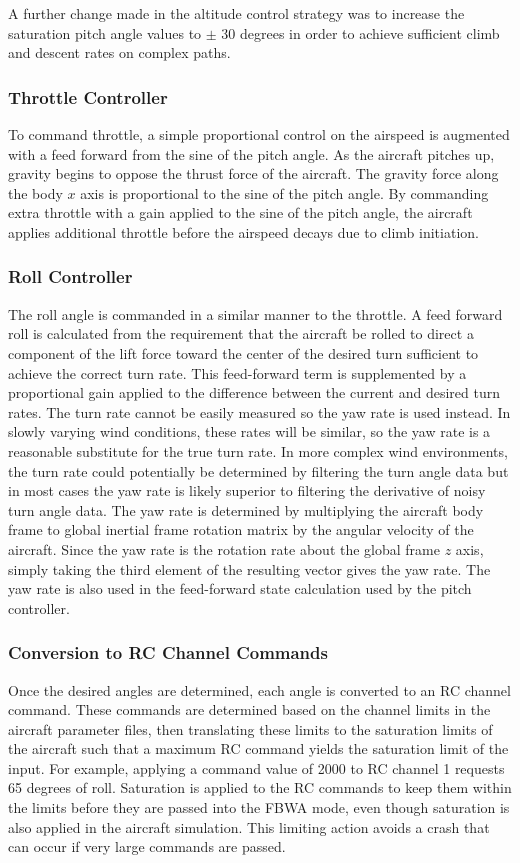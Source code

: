 \documentclass{aiaa}
\begin{document}
A further change made in the altitude control strategy was to increase the saturation pitch angle values to $\pm$ 30 degrees in order to achieve sufficient climb and descent rates on complex paths.

\subsubsection{Throttle Controller}
To command throttle, a simple proportional control on the airspeed is augmented with a feed forward from the sine of the pitch angle. As the aircraft pitches up, gravity begins to oppose the thrust force of the aircraft. The gravity force along the body $x$ axis is proportional to the sine of the pitch angle. By commanding extra throttle with a gain applied to the sine of the pitch angle, the aircraft applies additional throttle before the airspeed decays due to climb initiation.

\subsubsection{Roll Controller}
The roll angle is commanded in a similar manner to the throttle. A feed forward roll is calculated from the requirement that the aircraft be rolled to direct a component of the lift force toward the center of the desired turn sufficient to achieve the correct turn rate. This feed-forward term is supplemented by a proportional gain applied to the difference between the current and desired turn rates. The turn rate cannot be easily measured so the yaw rate is used instead. In slowly varying wind conditions, these rates will be similar, so the yaw rate is a reasonable substitute for the true turn rate. In more complex wind environments, the turn rate could potentially be determined by filtering the turn angle data but in most cases the yaw rate is likely superior to filtering the derivative of noisy turn angle data. The yaw rate is determined by multiplying the aircraft body frame to global inertial frame rotation matrix by the angular velocity of the aircraft. Since the yaw rate is the rotation rate about the global frame $z$ axis, simply taking the third element of the resulting vector gives the yaw rate. The yaw rate is also used in the feed-forward state calculation used by the pitch controller.

\subsubsection{Conversion to RC Channel Commands}
Once the desired angles are determined, each angle is converted to an RC channel command. These commands are determined based on the channel limits in the aircraft parameter files, then translating these limits to the saturation limits of the aircraft such that a maximum RC command yields the saturation limit of the input. For example, applying a command value of 2000 to RC channel 1 requests 65 degrees of roll.  Saturation is applied to the RC commands to keep them within the limits before they are passed into the FBWA mode, even though saturation is also applied in the aircraft simulation. This limiting action avoids a crash that can occur if very large commands are passed.
\end{document}
